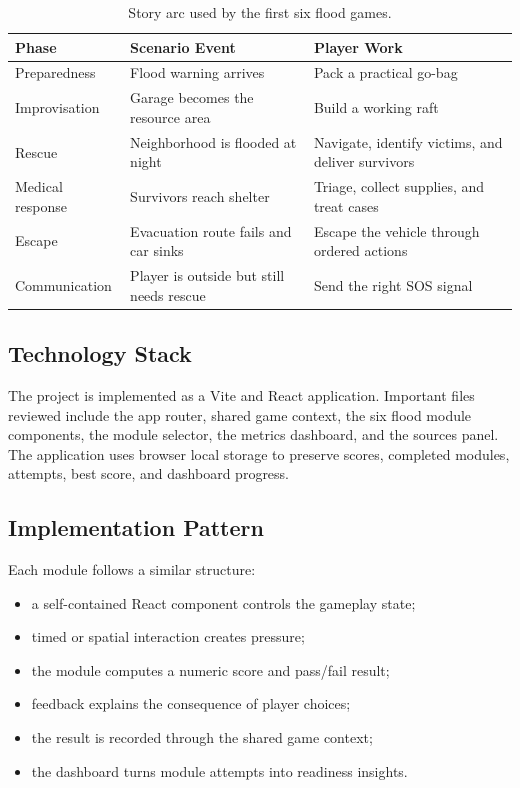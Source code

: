 \documentclass[11pt,a4paper]{article}
\begin{document}
\begin{table}[h]
\centering
\small
\begin{tabularx}{\textwidth}{L{0.18\textwidth}Y Y}
\toprule
\textbf{Phase} & \textbf{Scenario Event} & \textbf{Player Work} \\
\midrule
Preparedness & Flood warning arrives & Pack a practical go-bag \\
Improvisation & Garage becomes the resource area & Build a working raft \\
Rescue & Neighborhood is flooded at night & Navigate, identify victims, and deliver survivors \\
Medical response & Survivors reach shelter & Triage, collect supplies, and treat cases \\
Escape & Evacuation route fails and car sinks & Escape the vehicle through ordered actions \\
Communication & Player is outside but still needs rescue & Send the right SOS signal \\
\bottomrule
\end{tabularx}
\caption{Story arc used by the first six flood games.}
\end{table}

\subsection{Technology Stack}
The project is implemented as a Vite and React application. Important files reviewed include the app router, shared game context, the six flood module components, the module selector, the metrics dashboard, and the sources panel. The application uses browser local storage to preserve scores, completed modules, attempts, best score, and dashboard progress.

\subsection{Implementation Pattern}
Each module follows a similar structure:
\begin{itemize}
  \item a self-contained React component controls the gameplay state;
  \item timed or spatial interaction creates pressure;
  \item the module computes a numeric score and pass/fail result;
  \item feedback explains the consequence of player choices;
  \item the result is recorded through the shared game context;
  \item the dashboard turns module attempts into readiness insights.
\end{itemize}
\end{document}
